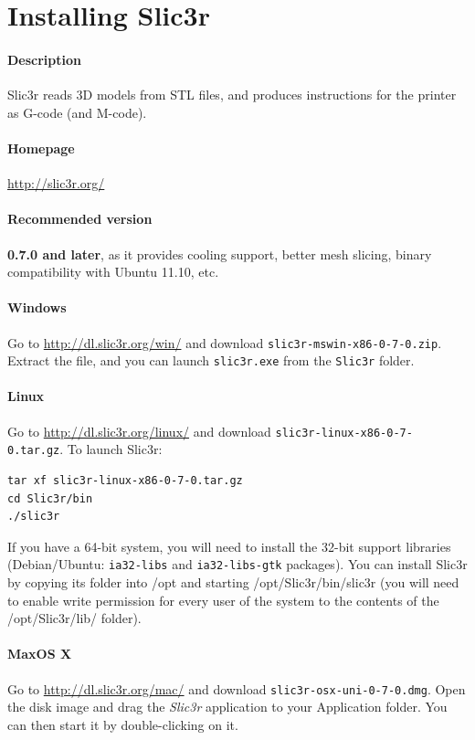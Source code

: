 \documentclass{article}
\begin{document}
\newpage

\section{Installing Slic3r}

	\paragraph{Description} Slic3r reads 3D models from STL files, and produces instructions for the printer as G-code (and M-code).

	\paragraph{Homepage} \url{http://slic3r.org/}

	\paragraph{Recommended version} \textbf{0.7.0 and later}, as it provides cooling support, better mesh slicing, binary compatibility with Ubuntu 11.10, etc.

	\paragraph{Windows} Go to \url{http://dl.slic3r.org/win/} and download \texttt{slic3r-mswin-x86-0-7-0.zip}. Extract the file, and you can launch \texttt{slic3r.exe} from the \texttt{Slic3r} folder.

	\paragraph{Linux} Go to \url{http://dl.slic3r.org/linux/} and download \texttt{slic3r-linux-x86-0-7-0.tar.gz}. To launch Slic3r:
		\begin{verbatim}
tar xf slic3r-linux-x86-0-7-0.tar.gz
cd Slic3r/bin
./slic3r
		\end{verbatim}
	If you have a 64-bit system, you will need to install the 32-bit support libraries (Debian/Ubuntu: \texttt{ia32-libs} and \texttt{ia32-libs-gtk} packages). You can install Slic3r by copying its folder into /opt and starting /opt/Slic3r/bin/slic3r (you will need to enable write permission for every user of the system to the contents of the /opt/Slic3r/lib/ folder).

	\paragraph{MaxOS X} Go to \url{http://dl.slic3r.org/mac/} and download \texttt{slic3r-osx-uni-0-7-0.dmg}. Open the disk image and drag the \emph{Slic3r} application to your Application folder. You can then start it by double-clicking on it.
\end{document}
